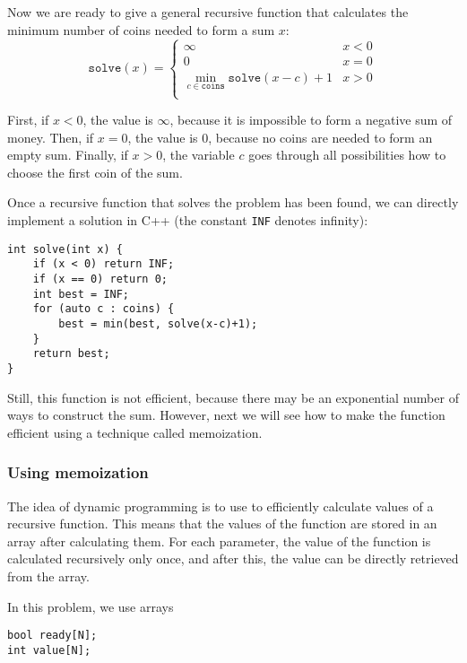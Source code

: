 Now we are ready to give a general recursive function
that calculates the minimum number of
coins needed to form a sum $x$:
\begin{equation*}
    \texttt{solve}(x) = \begin{cases}
               \infty               & x < 0\\
               0               & x = 0\\
               \min_{c \in \texttt{coins}} \texttt{solve}(x-c)+1 & x > 0 \\
           \end{cases}
\end{equation*}

First, if $x<0$, the value is $\infty$,
because it is impossible to form a negative
sum of money.
Then, if $x=0$, the value is $0$,
because no coins are needed to form an empty sum.
Finally, if $x>0$, the variable $c$ goes through
all possibilities how to choose the first coin
of the sum.

Once a recursive function that solves the problem
has been found,
we can directly implement a solution in C++
(the constant \texttt{INF} denotes infinity):

\begin{lstlisting}
int solve(int x) {
    if (x < 0) return INF;
    if (x == 0) return 0;
    int best = INF;
    for (auto c : coins) {
        best = min(best, solve(x-c)+1);
    }
    return best;
}
\end{lstlisting}

Still, this function is not efficient,
because there may be an exponential number of ways
to construct the sum.
However, next we will see how to make the
function efficient using a technique called memoization.

\subsubsection{Using memoization}


The idea of dynamic programming is to use
 to efficiently calculate
values of a recursive function.
This means that the values of the function
are stored in an array after calculating them.
For each parameter, the value of the function
is calculated recursively only once, and after this,
the value can be directly retrieved from the array.

In this problem, we use arrays
\begin{lstlisting}
bool ready[N];
int value[N];
\end{lstlisting}

